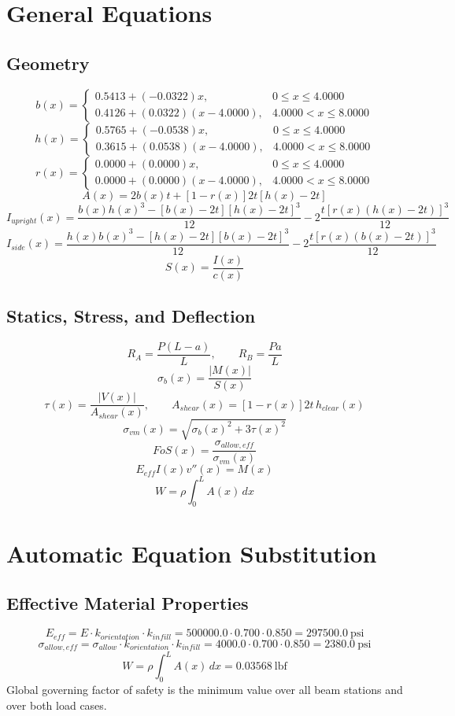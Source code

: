\documentclass[11pt]{article}
\begin{document}
\section*{General Equations}
\subsection*{Geometry}
\[
b(x)=\begin{cases}0.5413 + (-0.0322)x, & 0 \le x \le 4.0000\\0.4126 + (0.0322)(x-4.0000), & 4.0000 < x \le 8.0000\end{cases}
\]
\[
h(x)=\begin{cases}0.5765 + (-0.0538)x, & 0 \le x \le 4.0000\\0.3615 + (0.0538)(x-4.0000), & 4.0000 < x \le 8.0000\end{cases}
\]
\[
r(x)=\begin{cases}0.0000 + (0.0000)x, & 0 \le x \le 4.0000\\0.0000 + (0.0000)(x-4.0000), & 4.0000 < x \le 8.0000\end{cases}
\]
\[
A(x)=2b(x)t+[1-r(x)]2t[h(x)-2t]
\]
\[
I_{upright}(x)=\frac{b(x)h(x)^3-[b(x)-2t][h(x)-2t]^3}{12}-2\frac{t[r(x)(h(x)-2t)]^3}{12}
\]
\[
I_{side}(x)=\frac{h(x)b(x)^3-[h(x)-2t][b(x)-2t]^3}{12}-2\frac{t[r(x)(b(x)-2t)]^3}{12}
\]
\[
S(x)=\frac{I(x)}{c(x)}
\]

\subsection*{Statics, Stress, and Deflection}
\[
R_A=\frac{P(L-a)}{L}, \qquad R_B=\frac{Pa}{L}
\]
\[
\sigma_b(x)=\frac{|M(x)|}{S(x)}
\]
\[
\tau(x)=\frac{|V(x)|}{A_{shear}(x)}, \qquad A_{shear}(x)=[1-r(x)]2t\,h_{clear}(x)
\]
\[
\sigma_{vm}(x)=\sqrt{\sigma_b(x)^2+3\tau(x)^2}
\]
\[
FoS(x)=\frac{\sigma_{allow,eff}}{\sigma_{vm}(x)}
\]
\[
E_{eff}I(x)v''(x)=M(x)
\]
\[
W=\rho\int_0^L A(x)\,dx
\]

\section*{Automatic Equation Substitution}
\subsection*{Effective Material Properties}
\[E_{eff} = E \cdot k_{orientation} \cdot k_{infill} = 500000.0 \cdot 0.700 \cdot 0.850 = 297500.0\ \mathrm{psi}\]
\[\sigma_{allow,eff} = \sigma_{allow} \cdot k_{orientation} \cdot k_{infill} = 4000.0 \cdot 0.700 \cdot 0.850 = 2380.0\ \mathrm{psi}\]
\[W = \rho \int_0^L A(x)\,dx = 0.03568\ \mathrm{lbf}\]
Global governing factor of safety is the minimum value over all beam stations and over both load cases.
\end{document}
